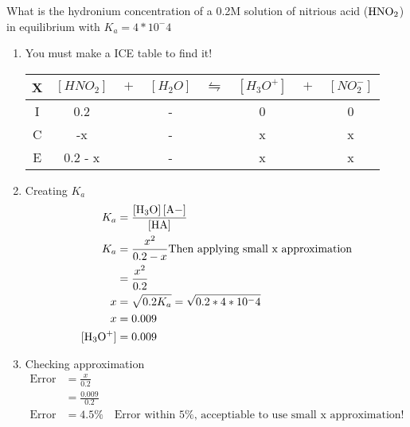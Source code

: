 \documentclass[../CHEM152Notes.tex]{subfiles}
\begin{document}
\begin{exmp}
    What is the hydronium concentration of a 0.2M solution of nitrious acid ($\ce{HNO2}$) in equilibrium with $K_a = 4*10^-4$
\end{exmp}
\begin{enumerate}
    \item You must make a ICE table to find it! \\
    \begin{tabular}{c|c@{}c@{}c@{}c@{}c@{}c@{}c}
        \hline
        X   &   $[HNO_2]$ & ${}+{}$ & $[H_2O]$ & ${}\leftrightharpoons{}$ & $[H_3O^+]$ & ${}+{}$ & $[NO_2^-]$\\
        \hline
        I   & 0.2 && - &&  0 && 0       \\
        C   & -x && - &&  x && x      \\
        E   & 0.2 - x && - && x && x      \\
        \hline
      \end{tabular}
    \item Creating $K_a$ 
    \begin{equation*}
        \begin{aligned}
            K_a &= \ce{\frac{[H3O] [A-]}{[HA]}} \\
            K_a &= \frac{x^2}{0.2-x} \text{Then applying small x approximation} \\
                &= \frac{x^2}{0.2} \\
            x   &= \sqrt{0.2K_a} = \sqrt{0.2*4*10^-4} \\
            x   &= 0.009 \\
            \ce{[H3O+]} &= 0.009
        \end{aligned}
    \end{equation*}
    \item Checking approximation 
    \begin{equation*}
        \begin{aligned}
            \text{Error} &= \frac{x}{0.2} \\
            &= \frac{0.009}{0.2} \\
            \text{Error} &= 4.5\% \quad \text{Error within 5\%, acceptiable to use small x approximation!}
        \end{aligned}
    \end{equation*}
\end{enumerate}
\end{document}
